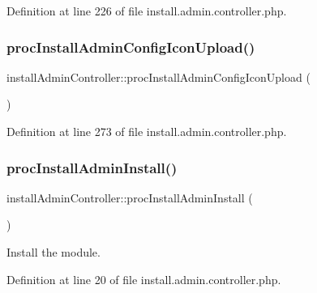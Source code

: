Definition at line 226 of file install.\+admin.\+controller.\+php.

\hypertarget{classinstallAdminController_a43a0d4db547322f22884c7dffbda6b87}{}\label{classinstallAdminController_a43a0d4db547322f22884c7dffbda6b87} 
\subsubsection{\texorpdfstring{proc\+Install\+Admin\+Config\+Icon\+Upload()}{procInstallAdminConfigIconUpload()}}
{\footnotesize\ttfamily install\+Admin\+Controller\+::proc\+Install\+Admin\+Config\+Icon\+Upload (\begin{DoxyParamCaption}{ }\end{DoxyParamCaption})}



Definition at line 273 of file install.\+admin.\+controller.\+php.

\hypertarget{classinstallAdminController_a9aa974c8cc406f536e712000ae7c431b}{}\label{classinstallAdminController_a9aa974c8cc406f536e712000ae7c431b} 
\subsubsection{\texorpdfstring{proc\+Install\+Admin\+Install()}{procInstallAdminInstall()}}
{\footnotesize\ttfamily install\+Admin\+Controller\+::proc\+Install\+Admin\+Install (\begin{DoxyParamCaption}{ }\end{DoxyParamCaption})}



Install the module. 



Definition at line 20 of file install.\+admin.\+controller.\+php.

\hypertarget{classinstallAdminController_a76919653ad07627e7f0aa4b01cc2b9fe}{}\label{classinstallAdminController_a76919653ad07627e7f0aa4b01cc2b9fe} 
